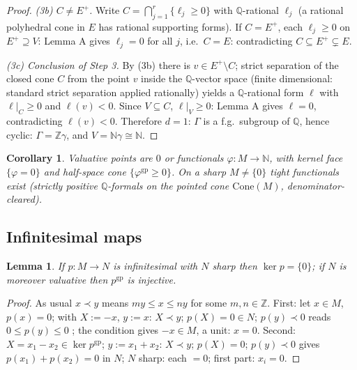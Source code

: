 \documentclass[11pt]{article}
\newtheorem{lemma}[theorem]{Lemma}
\newtheorem{corollary}[theorem]{Corollary}
\theoremstyle{definition}
\newcommand{\gp}{\mathrm{gp}}
\newcommand{\Cone}{\mathrm{Cone}}
\newcommand{\N}{\mathbb{N}}
\newcommand{\Z}{\mathbb{Z}}
\newcommand{\Q}{\mathbb{Q}}
\begin{document}
\begin{proof}
\emph{(3b) $C\ne E^+$.} Write $C=\bigcap_{j=1}^{r}
\{\ell_j\ge0\}$ with $\Q$-rational $\ell_j$ (a rational
polyhedral cone in $E$ has rational supporting forms). If
$C=E^+$, each $\ell_j\ge0$ on $E^+\supseteq V$: Lemma A gives
$\ell_j=0$ for all $j$, i.e.\ $C=E$: contradicting
$C\subseteq E^+\subsetneq E$.

\emph{(3c) Conclusion of Step 3.} By (3b) there is
$v\in E^+\setminus C$; strict separation of the closed cone $C$
from the point $v$ inside the $\Q$-vector space (finite
dimensional: standard strict separation applied rationally)
yields a $\Q$-rational form $\ell$ with $\ell|_C\ge0$ and
$\ell(v)<0$. Since $V\subseteq C$, $\ell|_V\ge0$: Lemma A gives
$\ell=0$, contradicting $\ell(v)<0$. Therefore $d=1$: $\Gamma$
is a f.g.\ subgroup of $\Q$, hence cyclic: $\Gamma=\Z\gamma$,
and $V=\N\gamma\cong\N$.
\end{proof}

\begin{corollary}\label{cor:function}
Valuative points are $0$ or functionals $\varphi:M\to\mathbb N$, with
kernel face $\{\varphi=0\}$ and half-space cone
$\{\varphi^{\gp}\ge0\}$. On a sharp $M\ne\{0\}$ tight functionals
exist \textup{(}strictly positive $\Q$-formals on the pointed cone
$\Cone(M)$, denominator-cleared\textup{)}.
\end{corollary}

\subsection{Infinitesimal maps}

\begin{lemma}\label{lem:inj0}
If $p:M\to N$ is infinitesimal with $N$ sharp then $\ker p=\{0\}$; if
$N$ is moreover valuative then $p^{\gp}$ is injective.
\end{lemma}


\begin{proof}
As usual $x\prec y$ means $my\le x\le ny$ for some $m,n\in\Z$.
First: let $x\in M$, $p(x)=0$; with $X:=-x$, $y:=x$: $X\prec y$;
$p(X)=0\in N$; $p(y)\prec0$ reads $0\le p(y)\le0$ \checkmark; the condition
gives $-x\in M$, a unit: $x=0$.
Second: $X=x_1-x_2\in\ker p^{\gp}$; $y:=x_1+x_2$: $X\prec y$;
$p(X)=0$; $p(y)\prec0$ gives $p(x_1)+p(x_2)=0$ in $N$; $N$ sharp:
each $=0$; first part: $x_i=0$.
\end{proof}
\end{document}
